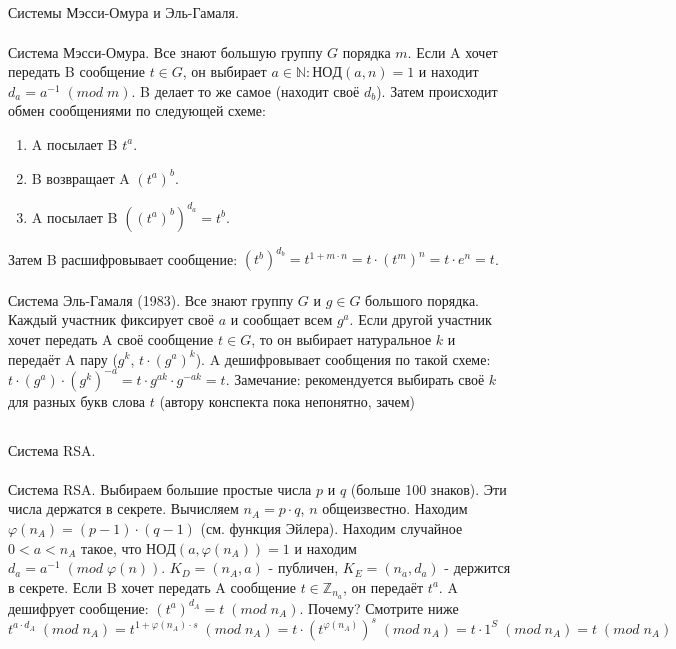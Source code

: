 \documentclass[a4paper,10pt]{article} %
\begin{document}
	\subsection{}
	Системы Мэсси-Омура и Эль-Гамаля.
	\\\\
	Система Мэсси-Омура. Все знают большую группу $G$ порядка $m$. Если A хочет передать B сообщение $t \in G$, он выбирает $a \in \mathbb{N}: НОД(a, n) = 1$ и находит $d_{a} = a^{-1} \; (mod \; m)$. B делает то же самое (находит своё $d_{b}$). Затем происходит обмен сообщениями по следующей схеме:
	\begin{enumerate}
		\item A посылает B $t^{a}$.
		\item B возвращает A $(t^{a})^{b}$.
		\item A посылает B $((t^{a})^{b})^{d_{a}} = t^{b}$.
	\end{enumerate}
	Затем B расшифровывает сообщение: $(t^{b})^{d_{b}} = t^{1 + m \cdot n} = t \cdot (t^{m})^n = t \cdot e^{n} = t$.
	\\\\
	Система Эль-Гамаля (1983). Все знают группу $G$ и $g \in G$ большого порядка.
	Каждый участник фиксирует своё $a$ и сообщает всем $g^{a}$. Если другой участник хочет передать A своё сообщение $t \in G$, то он выбирает натуральное $k$ и передаёт A пару ($g^{k}$, $t \cdot (g^{a})^{k}$). A дешифровывает сообщения по такой схеме: $t \cdot (g^{a}) \cdot (g^{k})^{-a} = t \cdot g^{ak} \cdot g^{-ak} = t$. Замечание: рекомендуется выбирать своё $k$ для разных букв слова $t$ (автору конспекта пока непонятно, зачем)
	\subsection{}
	Система RSA. 
	\\\\
	Система RSA. Выбираем большие простые числа $p$ и $q$ (больше 100 знаков). Эти числа держатся в секрете. Вычисляем $n_{A} = p \cdot q$, $n$ общеизвестно. Находим $\varphi(n_{A}) = (p - 1) \cdot (q - 1)$ (см. функция Эйлера). Находим случайное $0 < a < n_{A}$ такое, что $НОД(a, \varphi(n_{A})) = 1$ и находим $d_{a} = a^{-1} \; (mod \; \varphi(n))$. $K_{D} = (n_{A}, a)$ - публичен, $K_{E} = (n_{a}, d_{a})$ - держится в секрете. Если B хочет передать A сообщение $t \in \mathbb{Z}_{n_{a}}$, он передаёт $t^{a}$. A дешифрует сообщение: $(t^{a})^{d_{A}} = t \; (mod \; n_{A})$. Почему? Смотрите ниже
	\begin{equation}
	t^{a \cdot d_{A}} \; (mod \; n_{A}) =
	t^{1 + \varphi(n_{A}) \cdot s} \; (mod \; n_{A}) = 
	t \cdot (t^{\varphi(n_{A})})^s \; (mod \; n_{A}) = 
	t \cdot 1^{S} \; (mod \; n_{A}) = t \; (mod \; n_{A})
	\end{equation}
\end{document}

